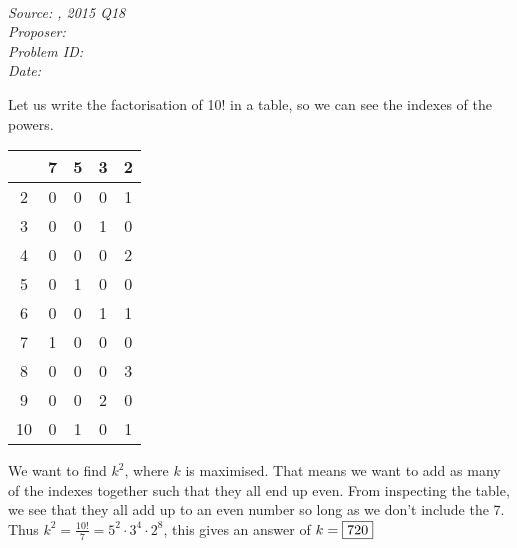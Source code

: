 \SSbreak\\
\emph{Source: \Csmc, 2015 Q18}\\
\emph{Proposer: \Pss}\\
\emph{Problem ID: }\\
\emph{Date: }\\
\SSbreak

\bigskip

\begin{solution}\hfil\medskip
	
Let us write the factorisation of 10! in a table, so we can see  the indexes of the powers.

	\begin{table}[h!]
		\centering
		\begin{tabular}{c|cccc}
		   & 7 & 5 & 3 & 2 \\ \hline
		2  & 0 & 0 & 0 & 1 \\
		3  & 0 & 0 & 1 & 0 \\
		4  & 0 & 0 & 0 & 2 \\
		5  & 0 & 1 & 0 & 0 \\
		6  & 0 & 0 & 1 & 1 \\
		7  & 1 & 0 & 0 & 0 \\
		8  & 0 & 0 & 0 & 3 \\
		9  & 0 & 0 & 2 & 0 \\
		10 & 0 & 1 & 0 & 1
		\end{tabular}
		\end{table}

We want to find \(k^2\), where \(k\) is maximised. That means we want to add as many of the indexes together such that they all end up even. From inspecting the table, we see that they all add up to an even number so long as we don't include the 7. Thus \(k^2=\frac{10!}{7}=5^2\cdot3^4\cdot2^8\), this gives an answer of \(k=\fbox{720}\)
\end{solution}\bigskip
